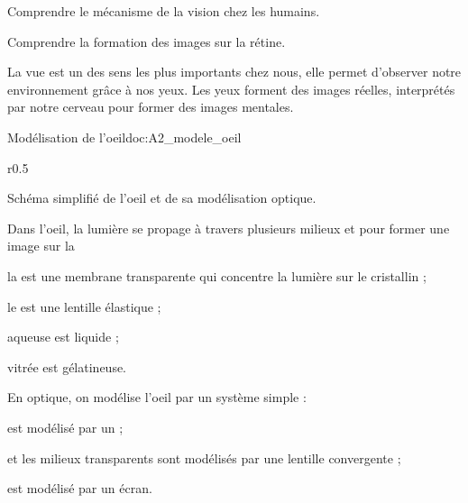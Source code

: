 \tetePremStssVisi



\begin{objectifs}
  \item Comprendre le mécanisme de la vision chez les humains.
  \item Comprendre la formation des images sur la rétine.
\end{objectifs}

\begin{contexte}
  La vue est un des sens les plus importants chez nous, elle permet d'observer notre environnement grâce à nos yeux.
  Les yeux forment des images réelles, interprétés par notre cerveau pour former des images mentales.
  
\end{contexte}


\begin{doc}{Modélisation de l'oeil}{doc:A2_modele_oeil}  
  \begin{wrapfigure}{r}{0.5\linewidth}
    \vspace*{-30pt}
    \centering

    \vspace*{-12pt}
    \small{Schéma simplifié de l'oeil et de sa modélisation optique.}
  \end{wrapfigure}

  Dans l'oeil, la lumière se propage à travers plusieurs milieux  et  pour former une image sur la 
  \begin{listePoints}
    \item la  est une membrane transparente qui concentre la lumière sur le cristallin ;
    \item le  est une lentille élastique ;
    \item {} aqueuse est liquide ;
    \item {} vitrée est gélatineuse.
  \end{listePoints}

  En optique, on modélise l'oeil par un système simple :
  \begin{listePoints}
    \item {} est modélisé par un  ;
    \item {} et les milieux transparents sont modélisés par une lentille convergente ;
    \item {} est modélisé par un écran.
  \end{listePoints}
\end{doc}

